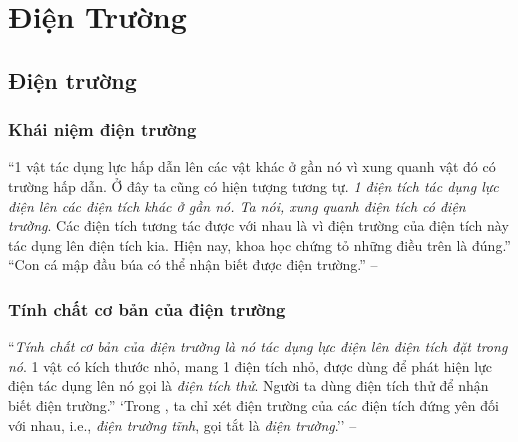 \documentclass[oneside]{book}
\numberwithin{equation}{section}
\begin{document}

\section{Điện Trường}

\subsection{Điện trường}

\subsubsection{Khái niệm điện trường}
``1 vật tác dụng lực hấp dẫn lên các vật khác ở gần nó vì xung quanh vật đó có trường hấp dẫn. Ở đây ta cũng có hiện tượng tương tự. \textit{1 điện tích tác dụng lực điện lên các điện tích khác ở gần nó. Ta nói, xung quanh điện tích có điện trường}. Các điện tích tương tác được với nhau là vì điện trường của điện tích này tác dụng lên điện tích kia. Hiện nay, khoa học chứng tỏ những điều trên là đúng.'' ``Con cá mập đầu búa có thể nhận biết được điện trường.'' -- \cite[p. 13]{SGK_Vat_Ly_11_nang_cao}

\subsubsection{Tính chất cơ bản của điện trường}
``\textit{Tính chất cơ bản của điện trường là nó tác dụng lực điện lên điện tích đặt trong nó}. 1 vật có kích thước nhỏ, mang 1 điện tích nhỏ, được dùng để phát hiện lực điện tác dụng lên nó gọi là \textit{điện tích thử}. Người ta dùng điện tích thử để nhận biết điện trường.'' `Trong \cite[Chap. 1]{SGK_Vat_Ly_11_nang_cao}, ta chỉ xét điện trường của các điện tích đứng yên đối với nhau, i.e., \textit{điện trường tĩnh}, gọi tắt là \textit{điện trường}.'' -- \cite[p. 13]{SGK_Vat_Ly_11_nang_cao}
\end{document}

